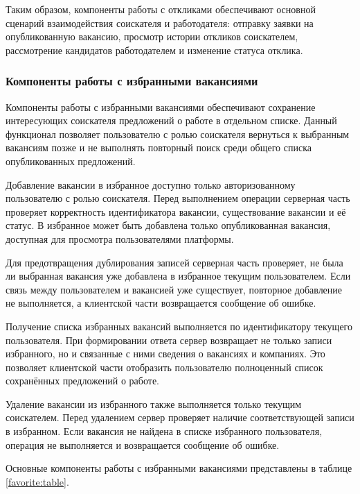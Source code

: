 Таким образом, компоненты работы с откликами обеспечивают основной сценарий взаимодействия соискателя и работодателя: отправку заявки на опубликованную вакансию, просмотр истории откликов соискателем, рассмотрение кандидатов работодателем и изменение статуса отклика.

\subsubsection{Компоненты работы с избранными вакансиями}

Компоненты работы с избранными вакансиями обеспечивают сохранение интересующих соискателя предложений о работе в отдельном списке. Данный функционал позволяет пользователю с ролью соискателя вернуться к выбранным вакансиям позже и не выполнять повторный поиск среди общего списка опубликованных предложений.

Добавление вакансии в избранное доступно только авторизованному пользователю с ролью соискателя. Перед выполнением операции серверная часть проверяет корректность идентификатора вакансии, существование вакансии и её статус. В избранное может быть добавлена только опубликованная вакансия, доступная для просмотра пользователями платформы.

Для предотвращения дублирования записей серверная часть проверяет, не была ли выбранная вакансия уже добавлена в избранное текущим пользователем. Если связь между пользователем и вакансией уже существует, повторное добавление не выполняется, а клиентской части возвращается сообщение об ошибке.

Получение списка избранных вакансий выполняется по идентификатору текущего пользователя. При формировании ответа сервер возвращает не только записи избранного, но и связанные с ними сведения о вакансиях и компаниях. Это позволяет клиентской части отобразить пользователю полноценный список сохранённых предложений о работе.

Удаление вакансии из избранного также выполняется только текущим соискателем. Перед удалением сервер проверяет наличие соответствующей записи в избранном. Если вакансия не найдена в списке избранного пользователя, операция не выполняется и возвращается сообщение об ошибке.

Основные компоненты работы с избранными вакансиями представлены в таблице \ref{favorite:table}.

